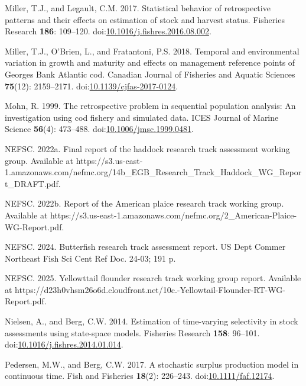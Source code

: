 \documentclass[
  12pt,
]{article}
\newlength{\cslhangindent}
\newenvironment{CSLReferences}[2] %
 {\begin{list}{}{%
  \setlength{\itemindent}{0pt}
  \setlength{\leftmargin}{0pt}
  \setlength{\parsep}{0pt}
  \ifodd #1
   \setlength{\leftmargin}{\cslhangindent}
   \setlength{\itemindent}{-1\cslhangindent}
  \fi
  \setlength{\itemsep}{#2\baselineskip}}}
 {\end{list}}
\begin{document}
\begin{CSLReferences}{1}{0}
Miller, T.J., and Legault, C.M. 2017. Statistical behavior of
retrospective patterns and their effects on estimation of stock and
harvest status. Fisheries Research \textbf{186}: 109--120.
doi:\href{https://doi.org/10.1016/j.fishres.2016.08.002}{10.1016/j.fishres.2016.08.002}.

Miller, T.J., O'Brien, L., and Fratantoni, P.S. 2018. Temporal and
environmental variation in growth and maturity and effects on management
reference points of {G}eorges {B}ank {A}tlantic cod. Canadian Journal of
Fisheries and Aquatic Sciences \textbf{75}(12): 2159--2171.
doi:\href{https://doi.org/10.1139/cjfas-2017-0124}{10.1139/cjfas-2017-0124}.

Mohn, R. 1999. The retrospective problem in sequential population
analysis: An investigation using cod fishery and simulated data. ICES
Journal of Marine Science \textbf{56}(4): 473--488.
doi:\href{https://doi.org/10.1006/jmsc.1999.0481}{10.1006/jmsc.1999.0481}.

NEFSC. 2022a. Final report of the haddock research track assessment
working group. {Available} at
https://s3.us-east-1.amazonaws.com/nefmc.org/14b\_EGB\_Research\_Track\_Haddock\_WG\_Report\_DRAFT.pdf.

NEFSC. 2022b. Report of the {A}merican plaice research track working
group. {Available} at
https://s3.us-east-1.amazonaws.com/nefmc.org/2\_American-Plaice-WG-Report.pdf.

NEFSC. 2024. Butterfish research track assessment report. US Dept Commer
Northeast Fish Sci Cent Ref Doc. 24-03; 191 p.

NEFSC. 2025. Yellowttail flounder research track working group report.
{Available} at
https://d23h0vhsm26o6d.cloudfront.net/10c.-Yellowtail-Flounder-RT-WG-Report.pdf.

Nielsen, A., and Berg, C.W. 2014. Estimation of time-varying selectivity
in stock assessments using state-space models. Fisheries Research
\textbf{158}: 96--101.
doi:\href{https://doi.org/10.1016/j.fishres.2014.01.014}{10.1016/j.fishres.2014.01.014}.

Pedersen, M.W., and Berg, C.W. 2017. A stochastic surplus production
model in continuous time. Fish and Fisheries \textbf{18}(2): 226--243.
doi:\href{https://doi.org/10.1111/faf.12174}{10.1111/faf.12174}.


\end{CSLReferences}
\end{document}
